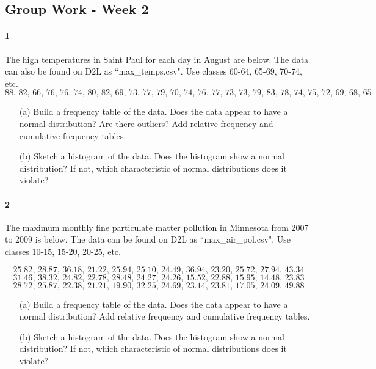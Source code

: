 \documentclass{article}
\begin{document}
\begin{flushleft}
\section*{Group Work - Week 2}
\paragraph{1} The high temperatures in Saint Paul for each day in August are below. The data can also be found on D2L as ``max\_temps.csv". Use classes 60-64, 65-69, 70-74, etc. 
\[88 ,\, 82 ,\, 66 ,\, 76 ,\, 76 ,\, 74 ,\, 80 ,\, 82 ,\, 69 ,\, 73 ,\, 77 ,\, 79 ,\, 70 ,\, 74 ,\, 76 ,\, 77 ,\, 73 ,\, 73 ,\, 79 ,\, 83 ,\, 78, \, 74 ,\, 75 ,\, 72 ,\, 69 ,\, 68 ,\, 65\]
\begin{itemize}
\item [(a)] Build a frequency table of the data. Does the data appear to have a normal distribution? Are there outliers? Add relative frequency and cumulative frequency tables.
\vspace{3in}
\item[(b)] Sketch a histogram of the data. Does the histogram show a normal distribution? If not, which characteristic of normal distributions does it violate?
\end{itemize}



\newpage
\paragraph{2} The maximum monthly fine particulate matter pollution in Minnesota from 2007 to 2009 is below. The data can be found on D2L as ``max\_air\_pol.csv". Use classes 10-15, 15-20, 20-25, etc. 

\[  25.82 ,\,  28.87 ,\, 36.18 ,\, 21.22 ,\, 25.94 ,\, 25.10 ,\, 24.49 ,\, 36.94 ,\, 23.20 ,\, 25.72 ,\, 27.94 ,\, 43.34 \] 
\[31.46 ,\, 38.32 ,\, 24.82 ,\, 22.78 ,\, 28.48 ,\, 24.27 ,\, 24.26 ,\, 15.52 ,\, 22.88 ,\, 15.95 ,\, 14.48 ,\, 23.83 \]
\[ 28.72 ,\, 25.87 ,\, 22.38 ,\, 21.21 ,\, 19.90 ,\, 32.25 ,\, 24.69 ,\, 23.14 ,\, 23.81 ,\, 17.05 ,\, 24.09 ,\, 49.88 \]
\begin{itemize}
\item [(a)] Build a frequency table of the data. Does the data appear to have a normal distribution? Add relative frequency and cumulative frequency tables.
\vspace{3in}
\item[(b)] Sketch a histogram of the data. Does the histogram show a normal distribution? If not, which characteristic of normal distributions does it violate?
\end{itemize}



\end{flushleft}
\end{document}
